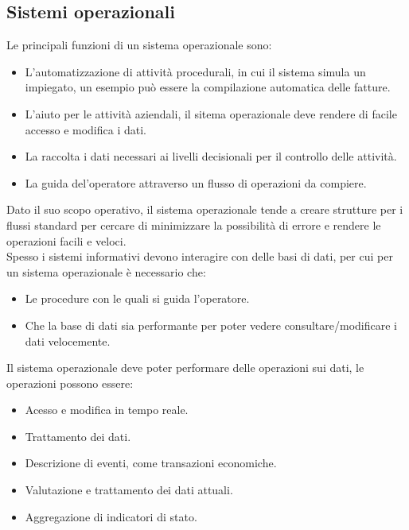 \documentclass{book}
\begin{document}
    \subsection{Sistemi operazionali}
    Le principali funzioni di un sistema operazionale sono:
    \begin{itemize}
        \item L'automatizzazione di attività procedurali, in cui il sistema simula un impiegato, un esempio può essere la compilazione automatica delle fatture.
        \item L'aiuto per le attività aziendali, il sitema operazionale deve rendere di facile accesso e modifica i dati.
        \item La raccolta i dati necessari ai livelli decisionali per il controllo delle attività.
        \item La guida del'operatore attraverso un flusso di operazioni da compiere.
    \end{itemize}
    Dato il suo scopo operativo, il sistema operazionale tende a creare strutture per i flussi standard per cercare di minimizzare la possibilità di errore e rendere le operazioni facili e veloci.\\
    Spesso i sistemi informativi devono interagire con delle basi di dati, per cui per un sistema operazionale è necessario che:
    \begin{itemize}
        \item Le procedure con le quali si guida l'operatore.
        \item Che la base di dati sia performante per poter vedere consultare/modificare i dati velocemente.
    \end{itemize}
    Il sistema operazionale deve poter performare delle operazioni sui dati, le operazioni possono essere:
    \begin{itemize}
        \item Acesso e modifica in tempo reale.
        \item Trattamento dei dati.
        \item Descrizione di eventi, come transazioni economiche.
        \item Valutazione e trattamento dei dati attuali.
        \item Aggregazione di indicatori di stato.
    \end{itemize}
\end{document}

